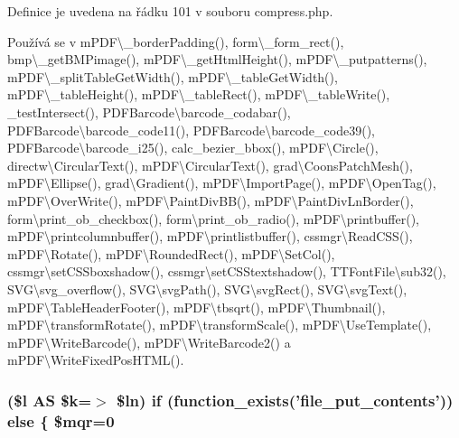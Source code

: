 Definice je uvedena na řádku 101 v souboru compress.\-php.



Používá se v m\-P\-D\-F\textbackslash{}\-\_\-border\-Padding(), form\textbackslash{}\-\_\-form\-\_\-rect(), bmp\textbackslash{}\-\_\-get\-B\-M\-Pimage(), m\-P\-D\-F\textbackslash{}\-\_\-get\-Html\-Height(), m\-P\-D\-F\textbackslash{}\-\_\-putpatterns(), m\-P\-D\-F\textbackslash{}\-\_\-split\-Table\-Get\-Width(), m\-P\-D\-F\textbackslash{}\-\_\-table\-Get\-Width(), m\-P\-D\-F\textbackslash{}\-\_\-table\-Height(), m\-P\-D\-F\textbackslash{}\-\_\-table\-Rect(), m\-P\-D\-F\textbackslash{}\-\_\-table\-Write(), \-\_\-test\-Intersect(), P\-D\-F\-Barcode\textbackslash{}barcode\-\_\-codabar(), P\-D\-F\-Barcode\textbackslash{}barcode\-\_\-code11(), P\-D\-F\-Barcode\textbackslash{}barcode\-\_\-code39(), P\-D\-F\-Barcode\textbackslash{}barcode\-\_\-i25(), calc\-\_\-bezier\-\_\-bbox(), m\-P\-D\-F\textbackslash{}\-Circle(), directw\textbackslash{}\-Circular\-Text(), m\-P\-D\-F\textbackslash{}\-Circular\-Text(), grad\textbackslash{}\-Coons\-Patch\-Mesh(), m\-P\-D\-F\textbackslash{}\-Ellipse(), grad\textbackslash{}\-Gradient(), m\-P\-D\-F\textbackslash{}\-Import\-Page(), m\-P\-D\-F\textbackslash{}\-Open\-Tag(), m\-P\-D\-F\textbackslash{}\-Over\-Write(), m\-P\-D\-F\textbackslash{}\-Paint\-Div\-B\-B(), m\-P\-D\-F\textbackslash{}\-Paint\-Div\-Ln\-Border(), form\textbackslash{}print\-\_\-ob\-\_\-checkbox(), form\textbackslash{}print\-\_\-ob\-\_\-radio(), m\-P\-D\-F\textbackslash{}printbuffer(), m\-P\-D\-F\textbackslash{}printcolumnbuffer(), m\-P\-D\-F\textbackslash{}printlistbuffer(), cssmgr\textbackslash{}\-Read\-C\-S\-S(), m\-P\-D\-F\textbackslash{}\-Rotate(), m\-P\-D\-F\textbackslash{}\-Rounded\-Rect(), m\-P\-D\-F\textbackslash{}\-Set\-Col(), cssmgr\textbackslash{}set\-C\-S\-Sboxshadow(), cssmgr\textbackslash{}set\-C\-S\-Stextshadow(), T\-T\-Font\-File\textbackslash{}sub32(), S\-V\-G\textbackslash{}svg\-\_\-overflow(), S\-V\-G\textbackslash{}svg\-Path(), S\-V\-G\textbackslash{}svg\-Rect(), S\-V\-G\textbackslash{}svg\-Text(), m\-P\-D\-F\textbackslash{}\-Table\-Header\-Footer(), m\-P\-D\-F\textbackslash{}tbsqrt(), m\-P\-D\-F\textbackslash{}\-Thumbnail(), m\-P\-D\-F\textbackslash{}transform\-Rotate(), m\-P\-D\-F\textbackslash{}transform\-Scale(), m\-P\-D\-F\textbackslash{}\-Use\-Template(), m\-P\-D\-F\textbackslash{}\-Write\-Barcode(), m\-P\-D\-F\textbackslash{}\-Write\-Barcode2() a m\-P\-D\-F\textbackslash{}\-Write\-Fixed\-Pos\-H\-T\-M\-L().

\hypertarget{compress_8php_af82782656503b252ac8af7dce0ca4bba}{
\subsubsection[{else}]{ (\$l A\-S \$k=$>$ \$ln) {\bf if} (function\-\_\-exists('file\-\_\-put\-\_\-contents')) else \{ \$mqr=0}}\label{compress_8php_af82782656503b252ac8af7dce0ca4bba}


